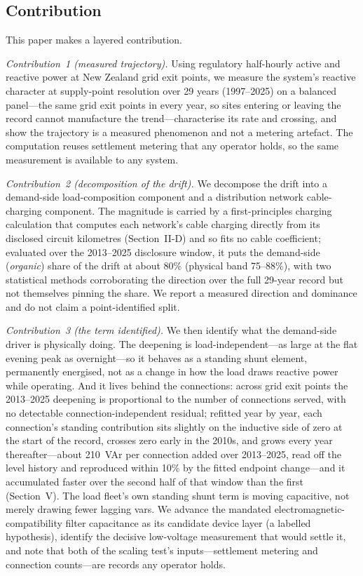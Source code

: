 \documentclass[journal]{IEEEtran}
\begin{document}
\subsection{Contribution}
This paper makes a layered contribution.

\emph{Contribution~1 (measured trajectory).} Using regulatory half-hourly active
and reactive power at New Zealand grid exit points, we measure the system's
reactive character at supply-point resolution over 29 years (1997--2025) on a
balanced panel---the same grid exit points in every year, so sites entering or
leaving the record cannot manufacture the trend---characterise its rate and
crossing, and show the trajectory is a measured phenomenon and not a metering
artefact. The computation
reuses settlement metering that any operator holds, so the same measurement is
available to any system.

\emph{Contribution~2 (decomposition of the drift).} We decompose the drift into
a demand-side load-composition component and a distribution network cable-charging component. The magnitude is carried by a first-principles charging calculation
that computes each network's cable charging directly from its disclosed
circuit kilometres (Section~II-D) and so fits no cable coefficient; evaluated
over the 2013--2025 disclosure window, it puts the demand-side (\emph{organic})
share of the drift at about 80\% (physical band 75--88\%), with two statistical
methods corroborating the direction over the full 29-year record but not
themselves pinning the share. We report a measured direction and dominance and
do not claim a point-identified split.

\emph{Contribution~3 (the term identified).} We then identify what the
demand-side driver is physically doing. The deepening is load-independent---as
large at the flat evening peak as overnight---so it behaves as a standing shunt
element, permanently energised, not as a change in how the load draws
reactive power while operating. And it lives behind the connections: across
grid exit points the 2013--2025 deepening is proportional to the number of
connections served, with no detectable connection-independent residual; refitted
year by
year, each connection's standing contribution sits slightly on the inductive
side of zero at the start of the record, crosses zero early in the 2010s, and
grows every
year thereafter---about 210~VAr per connection added over 2013--2025, read off the
level history and reproduced within 10\% by the fitted endpoint
change---and it accumulated faster over the second half of that window than
the first
(Section~V). The load fleet's own standing shunt term is moving capacitive,
not merely drawing fewer lagging vars. We advance the mandated
electromagnetic-compatibility filter capacitance as its candidate device layer
(a labelled hypothesis), identify the decisive low-voltage measurement that
would settle it, and note that both of the scaling test's inputs---settlement metering
and connection counts---are records any operator holds.
\end{document}
